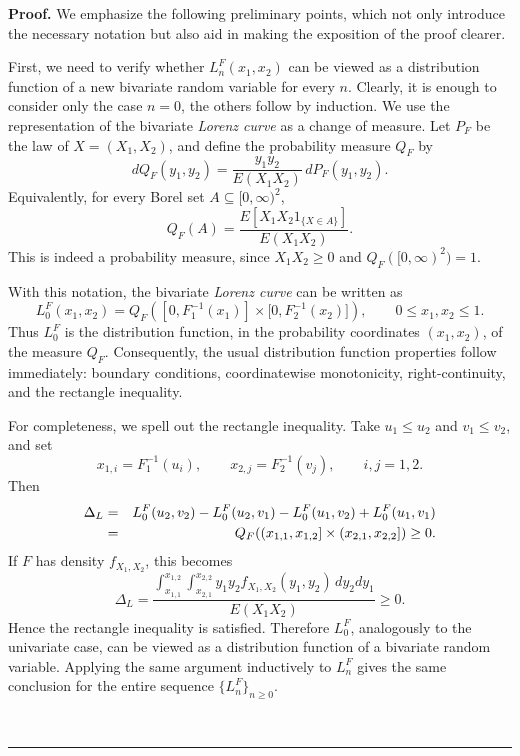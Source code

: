 \documentclass[onecolumn]{article}
\newenvironment{proof}[1][Proof]{\noindent\textbf{#1.} }{\ \rule{0.5em}{0.5em}}
\begin{document}
\begin{proof}
We emphasize the following preliminary points, which not only introduce the
necessary notation but also aid in making the exposition of the proof
clearer.

First, we need to verify whether $L_{n}^{F}(x_{1},x_{2})$ can be viewed as a
distribution function of a new bivariate random variable for every $n$.
Clearly, it is enough to consider only the case $n=0$, the others follow by
induction. We use the representation of the bivariate \textit{Lorenz curve}
as a change of measure. Let $P_{F}$ be the law of $X=(X_{1},X_{2})$, and
define the probability measure $Q_{F}$ by 
\begin{equation}
dQ_{F}(y_{1},y_{2})=\frac{y_{1}y_{2}}{E(X_{1}X_{2})}\,dP_{F}(y_{1},y_{2}).
\label{7.11}
\end{equation}%
Equivalently, for every Borel set $A\subseteq \lbrack 0,\infty )^{2}$, 
\begin{equation}
Q_{F}(A)=\frac{E\left[ X_{1}X_{2}1_{\{X\in A\}}\right] }{E(X_{1}X_{2})}.
\label{7.21}
\end{equation}%
This is indeed a probability measure, since $X_{1}X_{2}\geq 0$ and $%
Q_{F}([0,\infty )^{2})=1$.

With this notation, the bivariate \textit{Lorenz curve} can be written as 
\begin{equation}
L_{0}^{F}(x_{1},x_{2})=Q_{F}([0,F_{1}^{-1}(x_{1})]\times \lbrack
0,F_{2}^{-1}(x_{2})]),\qquad 0\leq x_{1},x_{2}\leq 1.  \label{7.31}
\end{equation}%
Thus $L_{0}^{F}$ is the distribution function, in the probability
coordinates $(x_{1},x_{2})$, of the measure $Q_{F}$. Consequently, the usual
distribution function properties follow immediately: boundary conditions,
coordinatewise monotonicity, right-continuity, and the rectangle inequality.

For completeness, we spell out the rectangle inequality. Take $u_{1}\leq
u_{2}$ and $v_{1}\leq v_{2}$, and set 
\begin{equation*}
x_{1,i}=F_{1}^{-1}(u_{i}),\qquad x_{2,j}=F_{2}^{-1}(v_{j}),\qquad i,j=1,2.
\end{equation*}%
Then 
\begin{eqnarray}
\Delta _{L}
&=&L_{0}^{F}(u_{2},v_{2})-L_{0}^{F}(u_{2},v_{1})-L_{0}^{F}(u_{1},v_{2})+L_{0}^{F}(u_{1},v_{1})
\notag \\
&=&Q_{F}((x_{1,1},x_{1,2}]\times (x_{2,1},x_{2,2}])\geq 0.  \label{7.41}
\end{eqnarray}%
If $F$ has density $f_{X_{1},X_{2}}$, this becomes 
\begin{equation}
\Delta _{L}=\frac{\int_{x_{1,1}}^{x_{1,2}}%
\int_{x_{2,1}}^{x_{2,2}}y_{1}y_{2}f_{X_{1},X_{2}}(y_{1},y_{2})\,dy_{2}dy_{1}%
}{E(X_{1}X_{2})}\geq 0.  \label{7.51}
\end{equation}%
Hence the rectangle inequality is satisfied. Therefore $L_{0}^{F}$,
analogously to the univariate case, can be viewed as a distribution function
of a bivariate random variable. Applying the same argument inductively to $%
L_{n}^{F}$ gives the same conclusion for the entire sequence $%
\{L_{n}^{F}\}_{n\geq 0}$.


\end{proof}
\end{document}

